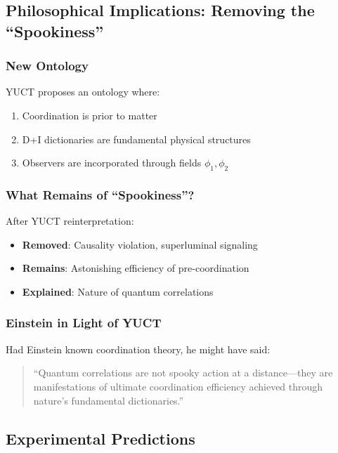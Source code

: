 \documentclass[11pt,a4paper]{article}
\begin{document}
	\subsection{Philosophical Implications: Removing the ``Spookiness''}
	\label{subsec:philosophical}
	
	\subsubsection{New Ontology}
	YUCT proposes an ontology where:
	\begin{enumerate}
		\item Coordination is prior to matter
		\item D+I dictionaries are fundamental physical structures
		\item Observers are incorporated through fields $\phi_1, \phi_2$
	\end{enumerate}
	
	\subsubsection{What Remains of ``Spookiness''?}
	After YUCT reinterpretation:
	\begin{itemize}
		\item \textbf{Removed}: Causality violation, superluminal signaling
		\item \textbf{Remains}: Astonishing efficiency of pre-coordination
		\item \textbf{Explained}: Nature of quantum correlations
	\end{itemize}
	
	\subsubsection{Einstein in Light of YUCT}
	Had Einstein known coordination theory, he might have said:
	
	\begin{quote}
		``Quantum correlations are not spooky action at a distance---they are manifestations of ultimate coordination efficiency achieved through nature's fundamental dictionaries.''
	\end{quote}
	
	\subsection{Experimental Predictions}
	\label{subsec:epr-experimental}
	
\end{document}
